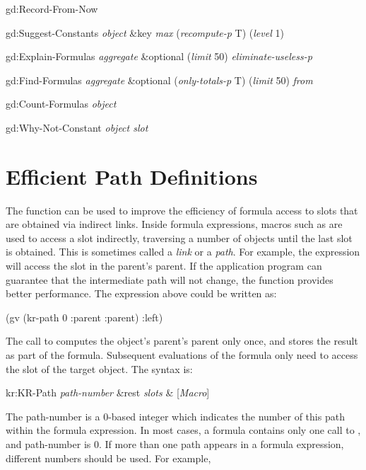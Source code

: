 \begin{programexample}
gd:Record-From-Now\value{function}

gd:Suggest-Constants {\it object} \&key {\it max} ({\it recompute-p} T) ({\it level} 1)\value{function}

gd:Explain-Formulas {\it aggregate} \&optional ({\it limit} 50) {\it eliminate-useless-p}\value{function}

gd:Find-Formulas {\it aggregate} \&optional ({\it only-totals-p} T) ({\it limit} 50) {\it from}\value{function}

gd:Count-Formulas {\it object}\value{function}

gd:Why-Not-Constant {\it object  slot}\value{function}
\end{programexample}


\section{Efficient Path Definitions}
\value{s-top}

The function  can be used to improve the efficiency of
formula access to slots that are obtained via indirect links.
Inside formula expressions, macros such as  are used to access a slot
indirectly, traversing a number of objects until the last slot is
obtained.  This is sometimes called a {\it link} or a {\it path}.  For
example, the expression  will access
the  slot in the parent's parent.  If the application program
can guarantee that the intermediate path will not change, the
function  provides better performance.  The expression
above could be written as:
\begin{programexample}
(gv (kr-path 0 :parent :parent) :left)
\end{programexample}
The call to  computes the object's parent's parent
only once, and stores the result as part of the formula.  Subsequent
evaluations of the formula only need to access the 
slot of the target object.  The syntax is:
\vspace{.5 line}
\begin{example}
kr:KR-Path {\it path-number} \&rest {\it slots} & [{\it Macro}]
\end{example}
\vspace{.5 line}
The path-number is a 0-based integer which indicates the number of
this path within the formula expression.  In most cases, a formula
contains only one call to , and path-number is 0.  If more
than one path appears in a formula expression, different numbers
should be used.  For example,

